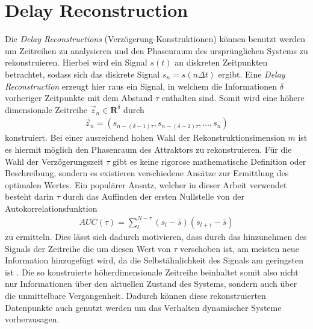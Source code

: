 \section{Delay Reconstruction}
\label{sc:delay_reconstruction}
Die \textit{Delay Reconstructions} (Verzögerung-Konstruktionen) können benutzt werden um Zeitreihen zu analysieren und den Phasenraum des ursprünglichen Systems zu rekonstruieren.
Hierbei wird ein Signal $s(t)$ an diskreten Zeitpunkten betrachtet, sodass sich das diskrete Signal $s_n = s(n\Delta t)$ ergibt. Eine \textit{Delay Reconstruction} erzeugt hier raus ein Signal, in welchem die Informationen $\delta$ vorheriger Zeitpunkte mit dem Abstand $\tau$ enthalten sind. Somit wird eine höhere dimensionale Zeitreihe $\vec{z}_n \in \mathbf{R}^{\delta}$ durch
\begin{align}
	\vec{z}_n = \left(s_{n-(\delta-1)\tau}, s_{n-(\delta-2)\tau}, \ldots ,s_n \right)
\end{align} 
konstruiert. Bei einer ausreichend hohen Wahl der Rekonstruktionsimension $m$ ist es hiermit möglich den Phasenraum des Attraktors zu rekonstruieren. Für die Wahl der Verzögerungszeit $\tau$ gibt es keine rigorose mathematische Definition oder Beschreibung, sondern es existieren verschiedene Ansätze zur Ermittlung des optimalen Wertes. Ein populärer Ansatz, welcher in dieser Arbeit verwendet besteht darin $\tau$ durch das Auffinden der ersten Nullstelle von der Autokorrelationsfunktion 
\begin{align}
AUC(\tau) = \sum_l^{N-\tau} (s_l-\bar{s})(s_{l+\tau}-\bar{s})
\end{align}   
zu ermitteln. Dies lässt sich dadurch motivieren, dass durch das hinzunehmen des Signals der Zeitreihe die um diesen Wert von $\tau$ verschoben ist, am meisten neue Information hinzugefügt wird, da die Selbstähnlichkeit des Signals am geringsten ist \citep[30\,ff.]{kantz2004nonlinear}.
Die so konstruierte höherdimensionale Zeitreihe beinhaltet somit also nicht nur Informationen über den aktuellen Zustand des Systems, sondern auch über die unmittelbare Vergangenheit. Dadurch können diese rekonstruierten Datenpunkte auch genutzt werden um das Verhalten dynamischer Systeme vorherzusagen. 